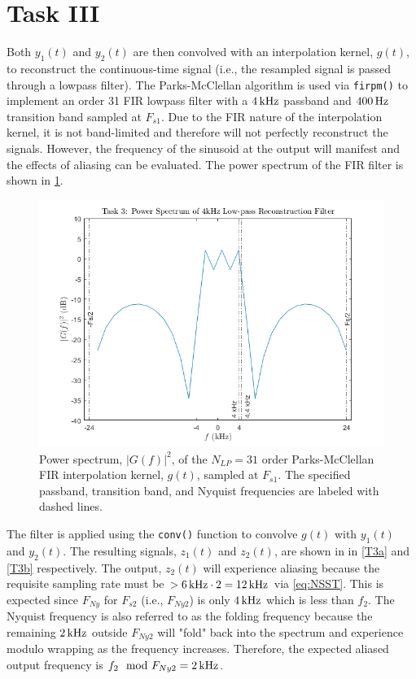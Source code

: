 \documentclass[a4paper,12pt]{article}
\newcommand{\Hz}[1]{%
    \ifcase#1
        \relax
    \or
        \,\text{Hz}
    \or
        \,\text{kHz}
    \or
        \,\text{MHz}
    \or
        \,\text{GHz}
    \else
        \,\text{Invalid}
    \fi
}
\begin{document}
\clearpage
\section*{Task III}
Both $y_1(t)$ and $y_2(t)$ are then convolved with an interpolation kernel, $g(t)$, to reconstruct the continuous-time signal (i.e., the resampled signal is passed through a lowpass filter). The Parks-McClellan algorithm is used via \texttt{firpm()} to implement an order 31 FIR lowpass filter with a $4\Hz{2}$ passband and $400\Hz{1}$ transition band sampled at $F_{s1}$. Due to the FIR nature of the interpolation kernel, it is not band-limited and therefore will not perfectly reconstruct the signals. However, the frequency of the sinusoid at the output will manifest and the effects of aliasing can be evaluated. The power spectrum of the FIR filter is shown in \cref{T3_filt}.

\begin{figure}[!h]
    \centering
    \includegraphics[width=1\textwidth]{T3_filt.png}
    \captionsetup{justification=centering}
    \caption{\small Power spectrum, $|G(f)|^2$, of the $N_{LP} = 31$ order Parks-McClellan FIR interpolation kernel, $g(t)$, sampled at $F_{s1}$. The specified passband, transition band, and Nyquist frequencies are labeled with dashed lines.}
    \label{T3_filt}
\end{figure}

The filter is applied using the \texttt{conv()} function to convolve $g(t)$ with $y_1(t)$ and $y_2(t)$. The resulting signals, $z_1(t)$ and $z_2(t)$, are shown in in \cref{T3a} and \cref{T3b} respectively. The output, $z_2(t)$ will experience aliasing because the requisite sampling rate must be $> 6\Hz{2} \cdot 2 = 12\Hz{2}$ via \cref{eq:NSST}. This is expected since $F_{Ny}$ for $F_{s2}$ (i.e., $F_{Ny2}$) is only $4\Hz{2}$ which is less than $f_2$. The Nyquist frequency is also referred to as the folding frequency because the remaining $2\Hz{2}$ outside $F_{Ny2}$ will "fold" back into the spectrum and experience modulo wrapping as the frequency increases. Therefore, the expected aliased output frequency is $f_2 \mod F_{Ny2} = 2\Hz{2}$.
\end{document}
